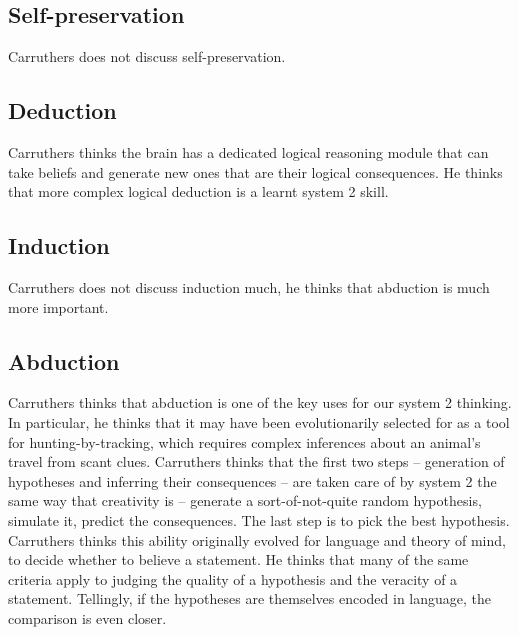 \documentclass[10pt,a4paper]{article}
\begin{document}
\subsection{Self-preservation}
Carruthers does not discuss self-preservation.

\subsection{Deduction}
Carruthers thinks the brain has a dedicated logical reasoning module that can take beliefs and generate new ones that are their logical consequences. He thinks that more complex logical deduction is a learnt system 2 skill.

\subsection{Induction}
Carruthers does not discuss induction much, he thinks that abduction is much more important.

\subsection{Abduction}
Carruthers thinks that abduction is one of the key uses for our system 2 thinking. In particular, he thinks that it may have been evolutionarily selected for as a tool for hunting-by-tracking, which requires complex inferences about an animal's travel from scant clues. Carruthers thinks that the first two steps -- generation of hypotheses and inferring their consequences -- are taken care of by system 2 the same way that creativity is -- generate a sort-of-not-quite random hypothesis, simulate it, predict the consequences. The last step is to pick the best hypothesis. Carruthers thinks this ability originally evolved for language and theory of mind, to decide whether to believe a statement. He thinks that many of the same criteria apply to judging the quality of a hypothesis and the veracity of a statement. Tellingly, if the hypotheses are themselves encoded in language, the comparison is even closer.


\end{document}
